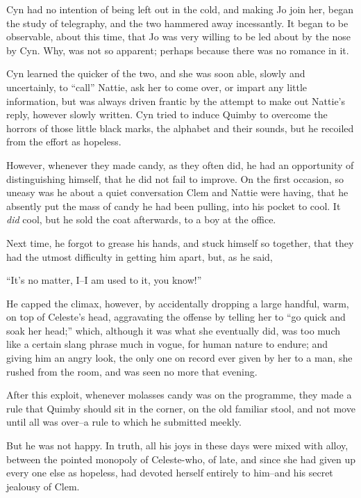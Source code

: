 Cyn had no intention of being left out in the cold, and making Jo join
her, began the study of telegraphy, and the two hammered away
incessantly. It began to be observable, about this time, that Jo was
very willing to be led about by the nose by Cyn. Why, was not so
apparent; perhaps because there was no romance in it.

Cyn learned the quicker of the two, and she was soon able, slowly and
uncertainly, to ``call'' Nattie, ask her to come over, or impart any
little information, but was always driven frantic by the attempt to make
out Nattie's reply, however slowly written. Cyn tried to induce Quimby
to overcome the horrors of those little black marks, the alphabet and
their sounds, but he recoiled from the effort as hopeless.

However, whenever they made candy, as they often did, he had an
opportunity of distinguishing himself, that he did not fail to improve.
On the first occasion, so uneasy was he about a quiet conversation Clem
and Nattie were having, that he absently put the mass of candy he had
been pulling, into his pocket to cool. It \emph{did} cool, but he sold the coat
afterwards, to a boy at the office.

Next time, he forgot to grease his hands, and stuck himself so together,
that they had the utmost difficulty in getting him apart, but, as he
said,

``It's no matter, I--I am used to it, you know!''

He capped the climax, however, by accidentally dropping a large handful,
warm, on top of Celeste's head, aggravating the offense by telling her
to ``go quick and soak her head;'' which, although it was what she
eventually did, was too much like a certain slang phrase much in vogue,
for human nature to endure; and giving him an angry look, the only one
on record ever given by her to a man, she rushed from the room, and was
seen no more that evening.

After this exploit, whenever molasses candy was on the programme, they
made a rule that Quimby should sit in the corner, on the old familiar
stool, and not move until all was over--a rule to which he submitted
meekly.

But he was not happy. In truth, all his joys in these days were mixed
with alloy, between the pointed monopoly of Celeste-who, of late, and
since she had given up every one else as hopeless, had devoted herself
entirely to him--and his secret jealousy of Clem.

